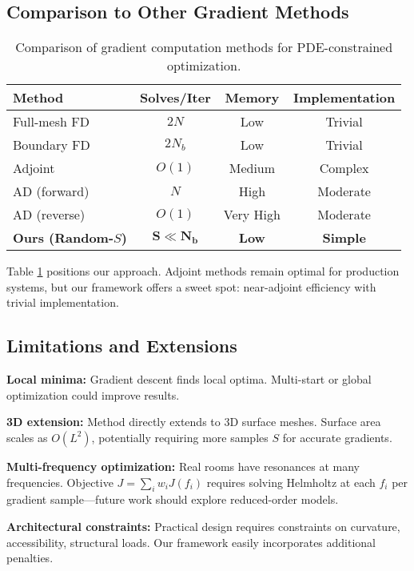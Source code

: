 \documentclass{article}
\begin{document}
\subsection{Comparison to Other Gradient Methods}

\begin{table}[t]
\centering
\caption{Comparison of gradient computation methods for PDE-constrained optimization.}
\label{tab:comparison}
\small
\begin{tabular}{lccc}
\toprule
\textbf{Method} & \textbf{Solves/Iter} & \textbf{Memory} & \textbf{Implementation} \\
\midrule
Full-mesh FD & $2N$ & Low & Trivial \\
Boundary FD & $2N_b$ & Low & Trivial \\
Adjoint & $O(1)$ & Medium & Complex \\
AD (forward) & $N$ & High & Moderate \\
AD (reverse) & $O(1)$ & Very High & Moderate \\
\textbf{Ours (Random-$S$)} & $\mathbf{S \ll N_b}$ & \textbf{Low} & \textbf{Simple} \\
\bottomrule
\end{tabular}
\end{table}

Table \ref{tab:comparison} positions our approach. Adjoint methods remain optimal for production systems, but our framework offers a sweet spot: near-adjoint efficiency with trivial implementation.

\subsection{Limitations and Extensions}

\textbf{Local minima:} Gradient descent finds local optima. Multi-start or global optimization could improve results.

\textbf{3D extension:} Method directly extends to 3D surface meshes. Surface area scales as $O(L^2)$, potentially requiring more samples $S$ for accurate gradients.

\textbf{Multi-frequency optimization:} Real rooms have resonances at many frequencies. Objective $J = \sum_i w_i J(f_i)$ requires solving Helmholtz at each $f_i$ per gradient sample—future work should explore reduced-order models.

\textbf{Architectural constraints:} Practical design requires constraints on curvature, accessibility, structural loads. Our framework easily incorporates additional penalties.
\end{document}

